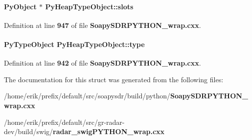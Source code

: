 \paragraph[{slots}]{\setlength{\rightskip}{0pt plus 5cm}Py\+Object $\ast$ Py\+Heap\+Type\+Object\+::slots}\label{structPyHeapTypeObject_a15212a8f85d939b3f4b133ecda1b62e5}


Definition at line {\bf 947} of file {\bf Soapy\+S\+D\+R\+P\+Y\+T\+H\+O\+N\+\_\+wrap.\+cxx}.

\paragraph[{type}]{\setlength{\rightskip}{0pt plus 5cm}Py\+Type\+Object Py\+Heap\+Type\+Object\+::type}\label{structPyHeapTypeObject_a8b961137de4ebeed5a5d2e4b47ee1ca7}


Definition at line {\bf 942} of file {\bf Soapy\+S\+D\+R\+P\+Y\+T\+H\+O\+N\+\_\+wrap.\+cxx}.



The documentation for this struct was generated from the following files\+:\begin{DoxyCompactItemize}
\item 
/home/erik/prefix/default/src/soapysdr/build/python/{\bf Soapy\+S\+D\+R\+P\+Y\+T\+H\+O\+N\+\_\+wrap.\+cxx}\item 
/home/erik/prefix/default/src/gr-\/radar-\/dev/build/swig/{\bf radar\+\_\+swig\+P\+Y\+T\+H\+O\+N\+\_\+wrap.\+cxx}\end{DoxyCompactItemize}

